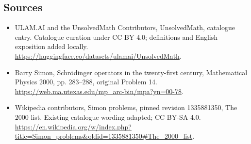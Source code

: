 \documentclass[11pt]{article}
\begin{document}
\subsection{Sources}
\begin{itemize}
\item[\hypertarget{source:statement:1}{S1}] ULAM.AI and the UnsolvedMath Contributors, UnsolvedMath, catalogue entry. Catalogue curation under CC BY 4.0; definitions and English exposition added locally.
\url{https://huggingface.co/datasets/ulamai/UnsolvedMath}.
\item[\hypertarget{source:statement:2}{S2}] Barry Simon, Schrödinger operators in the twenty-first century, Mathematical Physics 2000, pp. 283–288, original Problem 14.
\url{https://web.ma.utexas.edu/mp_arc-bin/mpa?yn=00-78}.
\item[\hypertarget{source:statement:3}{S3}] Wikipedia contributors, Simon problems, pinned revision 1335881350, The 2000 list. Existing catalogue wording adapted; CC BY-SA 4.0.
\url{https://en.wikipedia.org/w/index.php?title=Simon_problems&oldid=1335881350#The_2000_list}.
\end{itemize}
\label{end:statement}
\end{document}

